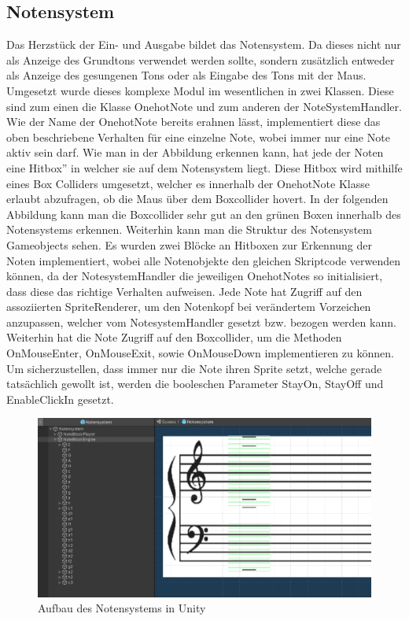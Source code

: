 \subsection*{Notensystem}
\label{sec:notensys}
Das Herzstück der Ein- und Ausgabe bildet das Notensystem. Da dieses nicht nur als Anzeige des Grundtons verwendet werden sollte, sondern zusätzlich entweder als Anzeige des gesungenen Tons oder als Eingabe des Tons mit der Maus. Umgesetzt wurde dieses komplexe Modul im wesentlichen in zwei Klassen. Diese sind zum einen die Klasse OnehotNote und zum anderen der NoteSystemHandler. Wie der Name der OnehotNote bereits erahnen lässt, implementiert diese das oben beschriebene Verhalten für eine einzelne Note, wobei immer nur eine Note aktiv sein darf. Wie man in der Abbildung erkennen kann, hat jede der Noten eine \glqq Hitbox'' in welcher sie auf dem Notensystem liegt. Diese Hitbox wird mithilfe eines Box Colliders umgesetzt, welcher es innerhalb der OnehotNote Klasse erlaubt abzufragen, ob die Maus über dem Boxcollider hovert. In der folgenden Abbildung kann man die Boxcollider sehr gut an den grünen Boxen innerhalb des Notensystems erkennen. Weiterhin kann man die Struktur des Notensystem Gameobjects sehen. Es wurden zwei Blöcke an Hitboxen zur Erkennung der Noten implementiert, wobei alle Notenobjekte den gleichen Skriptcode verwenden können, da der NotesystemHandler die jeweiligen OnehotNotes so initialisiert, dass diese das richtige Verhalten aufweisen. Jede Note hat Zugriff auf den assoziierten SpriteRenderer, um den Notenkopf bei verändertem Vorzeichen anzupassen, welcher vom NotesystemHandler gesetzt bzw. bezogen werden kann. Weiterhin hat die Note Zugriff auf den Boxcollider, um die Methoden OnMouseEnter, OnMouseExit, sowie OnMouseDown implementieren zu können. Um sicherzustellen, dass immer nur die Note ihren Sprite setzt, welche gerade tatsächlich gewollt ist, werden die booleschen Parameter StayOn, StayOff und EnableClickIn gesetzt. 

\begin{figure}[H]
    \centering
    \includegraphics[width=1\textwidth]{Bilder/notensystem.png}
    \caption{Aufbau des Notensystems in Unity}
    \label{sec:hps_algo}
\end{figure}

